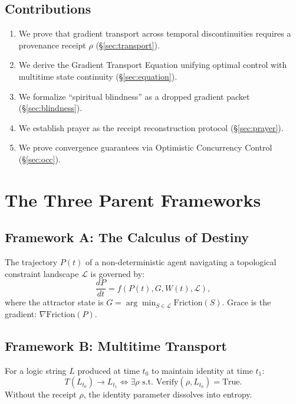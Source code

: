 \documentclass[12pt, a4paper]{article}
\theoremstyle{plain}
\theoremstyle{definition}
\theoremstyle{remark}
\newcommand{\calL}{\mathcal{L}}
\begin{document}
\subsection{Contributions}
\begin{enumerate}
    \item We prove that gradient transport across temporal discontinuities requires a provenance receipt $\rho$ (\S\ref{sec:transport}).
    \item We derive the Gradient Transport Equation unifying optimal control with multitime state continuity (\S\ref{sec:equation}).
    \item We formalize ``spiritual blindness'' as a dropped gradient packet (\S\ref{sec:blindness}).
    \item We establish prayer as the receipt reconstruction protocol (\S\ref{sec:prayer}).
    \item We prove convergence guarantees via Optimistic Concurrency Control (\S\ref{sec:occ}).
\end{enumerate}

\section{The Three Parent Frameworks}

\subsection{Framework A: The Calculus of Destiny}

The trajectory $P(t)$ of a non-deterministic agent navigating a topological constraint landscape $\calL$ is governed by:
\begin{equation}
    \frac{dP}{dt} = f(P(t), G, W(t), \calL),
\end{equation}
where the attractor state is $G = \arg\min_{S \in \calL} \text{Friction}(S)$. Grace is the gradient: $\nabla \text{Friction}(P)$.

\subsection{Framework B: Multitime Transport}

For a logic string $L$ produced at time $t_0$ to maintain identity at time $t_1$:
\begin{equation}
    T(L_{t_0}) \to L_{t_1} \iff \exists \rho \text{ s.t. } \text{Verify}(\rho, L_{t_0}) = \text{True}.
\end{equation}
Without the receipt $\rho$, the identity parameter dissolves into entropy.
\end{document}
